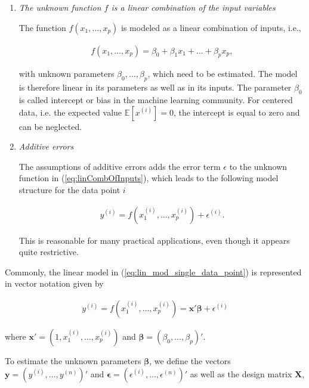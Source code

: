 \documentclass[10pt,a4paper]{article}
\begin{document}
\begin{enumerate}
	\item \emph{The unknown function $f$ is a linear combination of the input variables}
	
	The function $f(x_1, \dots, x_p)$ is modeled as a linear combination of inputs, i.e.,
	
	\begin{align} \label{eq:linCombOfInputs}
		f(x_1, \dots, x_p) = \beta_0 + \beta_1 x_1 + \dots + \beta_p x_p,
	\end{align}
	
	with unknown parameters $\beta_0, \dots, \beta_p$, which need to be estimated. The model is therefore linear in its parameters as well as in its inputs. \cite{bishop2006patternRecognition} The parameter $\beta_0$ is called intercept or bias in the machine learning community. For centered data, i.e. the expected value $\mathbb{E}[x^{(i)}] = 0$, the intercept is equal to zero and can be neglected.
		
	\item \emph{Additive errors}
	
	The assumptions of additive errors adds the error term $\epsilon$ to the unknown function in (\ref{eq:linCombOfInputs}), which leads to the following model structure for the data point $i$
	
	\begin{align} \label{eq:linModelOneDim}
		y^{(i)} = f(x^{(i)}_1, \dots, x^{(i)}_p) + \epsilon^{(i)}.
	\end{align}

	This is reasonable for many practical applications, even though it appears quite restrictive. 
\end{enumerate}

Commonly, the linear model in (\ref{eq:lin_mod_single_data_point}) is represented in vector notation given by

\begin{align} \label{eq:lin_mod_sp_vec_notation}
	 y^{(i)} = f(x^{(i)}_{1}, \dots, x^{(i)}_{p})  = \boldsymbol{x}' \boldsymbol{\beta} + \epsilon^{(i)}
\end{align}

where $\boldsymbol{x}' = (1, x^{(i)}_{1}, \dots, x^{(i)}_{p})$ and $\boldsymbol{\beta} = (\beta_0, \dots, \beta_p)'$.

To estimate the unknown parameters $\boldsymbol{\beta}$, we define the vectors $\boldsymbol{y} = (y^{(i)}, \dots, y^{(n)})'$ and $\boldsymbol{\epsilon} = (\epsilon^{(i)}, \dots, \epsilon^{(n)})'$ as well as the design matrix $\boldsymbol{X}$, 
\end{document}
